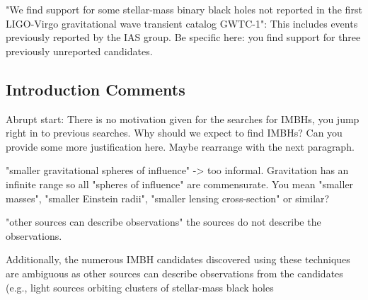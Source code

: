 \documentclass[11pt,leqno]{article}
\begin{document}
\begin{tcolorbox}[left = 1em, top = 1ex, bottom = 1ex, colupper=black, colback=black!10, adjusted title = Comment 2]
    \setlength\parindent{2em}
	\noindent
	\ttfamily
    "We find support for some stellar-mass binary black holes not reported in the first LIGO-Virgo gravitational wave transient catalog GWTC-1": This includes events previously reported by the IAS group. Be specific here: you find support for three previously unreported candidates.
\end{tcolorbox}




\subsection*{Introduction Comments} 
\begin{tcolorbox}[left = 1em, top = 1ex, bottom = 1ex, colupper=black, colback=black!10, adjusted title =  Comment 1]
    \setlength\parindent{2em}
	\noindent
	\ttfamily
    Abrupt start: There is no motivation given for the searches for IMBHs, you jump right in to previous searches. Why should we expect to find IMBHs? Can you provide some more justification here. Maybe rearrange with the next paragraph.
\end{tcolorbox}

\begin{tcolorbox}[left = 1em, top = 1ex, bottom = 1ex, colupper=black, colback=black!10, adjusted title =  Comment 2]
    \setlength\parindent{2em}
	\noindent
	\ttfamily
    "smaller gravitational spheres of influence" -> too informal. Gravitation has an infinite range so all "spheres of influence" are commensurate. You mean "smaller masses", "smaller Einstein radii", "smaller lensing cross-section" or similar?
\end{tcolorbox}

\begin{tcolorbox}[left = 1em, top = 1ex, bottom = 1ex, colupper=black, colback=black!10, adjusted title =  Comment 3]
    \setlength\parindent{2em}
	\noindent
	\ttfamily
    "other sources can describe observations" the sources do not describe the observations. 
\end{tcolorbox}

Additionally, the numerous IMBH candidates discovered using these techniques are ambiguous as other sources can describe observations from the candidates (e.g., light sources orbiting clusters of stellar-mass black holes 
\end{document}
